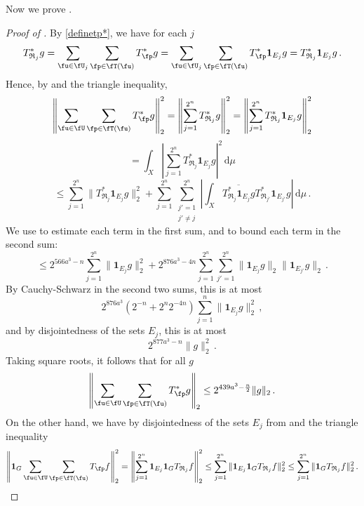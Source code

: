 Now we prove .

\begin{proof}[Proof of ]
    \leanok
    By \eqref{definetp*}, we have for each $j$
    $$
        T_{\mathfrak{R}_j}^*g = \sum_{\fu \in \fU_j} \sum_{\fp \in \fT(\fu)} T_{\fp}^* g = \sum_{\fu \in \fU_j} \sum_{\fp \in \fT(\fu)} T_{\fp}^* \mathbf{1}_{E_j} g = T_{\mathfrak{R}_j}^* \mathbf{1}_{E_j} g\,.
    $$
    Hence, by  and the triangle inequality,
    $$
        \left\|\sum_{\fu \in \fU} \sum_{\fp \in \fT(\fu)} T^*_{\fp} g\right\|_2^2 = \left\|\sum_{j = 1}^{2^n} T^*_{\mathfrak{R}_{j}} g\right\|_2^2 = \left\|\sum_{j=1}^{2^n} T^*_{\mathfrak{R}_{j}} \mathbf{1}_{E_j} g\right\|_2^2
    $$
    $$
        = \int_X \left|\sum_{j=1}^{2^n} T^*_{\mathfrak{R}_{j}} \mathbf{1}_{E_j} g\right|^2 \, \mathrm{d}\mu
    $$
    $$
        \le \sum_{j=1}^{2^n} \|T_{\mathfrak{R}_j}^* \mathbf{1}_{E_j} g\|_2^2 + \sum_{j =1}^{2^n} \sum_{\substack{j' = 1\\j' \ne j}}^{2^n} \left| \int_X \overline{ T_{\mathfrak{R}_j}^* \mathbf{1}_{E_j} g} T_{\mathfrak{R}_{j'}}^* \mathbf{1}_{E_{j'}} g \right| \, \mathrm{d}\mu\,.
    $$
    We use  to estimate each term in the first sum, and  to bound each term in the second sum:
    $$
        \le 2^{566a^3-n} \sum_{j = 1}^{2^n} \|\mathbf{1}_{E_j} g\|_2^2 + 2^{876a^3-4n}\sum_{j=1}^{2^n}\sum_{j' = 1}^{2^n} \|\mathbf{1}_{E_j} g\|_2 \|\mathbf{1}_{E_{j'}}g\|_2\,.
    $$
    By Cauchy-Schwarz in the second two sums, this is at most
    $$
        2^{876a^3} (2^{-n} + 2^{n}2^{-4n}) \sum_{j = 1}^n \|\mathbf{1}_{E_j} g\|_2^2\,,
    $$
    and by disjointedness of the sets $E_j$, this is at most
    $$
        2^{877a^3 - n} \|g\|_2^2\,.
    $$
    Taking square roots, it follows that for all $g$
    \begin{equation}
        \label{eq-forest-bound-1}
        \left\|\sum_{\fu \in \fU} \sum_{\fp \in \fT(\fu)} T_{\fp}^* g\right\|_2 \le 2^{439a^3-\frac{n}{2}} \|g\|_2\,.
    \end{equation}
    On the other hand, we have by disjointedness of the sets $E_j$ from  and the triangle inequality
    $$
        \left\|\mathbf{1}_G \sum_{\fu \in \fU} \sum_{\fp \in \fT(\fu)} T_{\fp} f\right\|_2^2 = \left\|\sum_{j=1}^{2^n} \mathbf{1}_{E_j} \mathbf{1}_G T_{\mathfrak{R}_{j}} f\right\|_2^2 \le \sum_{j = 1}^{2^n} \|\mathbf{1}_{E_j} \mathbf{1}_G T_{\mathfrak{R}_{j}} f\|_2^2 \le \sum_{j = 1}^{2^n} \|\mathbf{1}_G T_{\mathfrak{R}_{j}} f\|_2^2\,.
$$
\end{proof}

